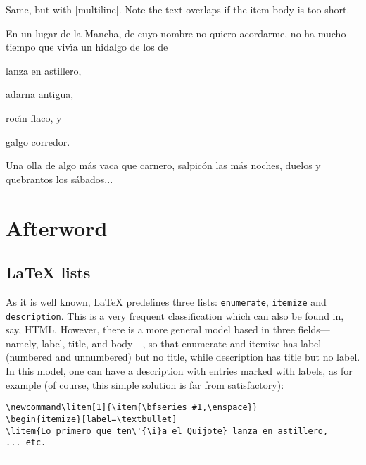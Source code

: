 \documentclass[a4paper]{ltxguide}
\begin{document}
\begin{enumerate}[leftmargin=*]
\begin{enumerate}[leftmargin=\parindent]
\begin{enumerate}[labelindent=\parindent,|\allowbreak
| leftmargin=*,|\allowbreak| label=\Roman*.,|\allowbreak
| widest=III,|\allowbreak| align=left]
\begin{enumerate}[label=\fbox{\arabic*}]
\newsample

Same, but with |multiline|. Note the text overlaps if the item body is
too short.

\samplesep

En un lugar de la Mancha, de cuyo nombre no quiero acordarme,
no ha mucho tiempo que viv\'{\i}a un hidalgo de los de
\begin{description}[font=\sffamily\bfseries, leftmargin=3cm,
    style=multiline]
\item[Lo primero que ten\'{\i}a el Quijote] lanza en astillero,
\item[Lo segundo] adarna antigua,
\item[Lo tercero] roc\'{\i}n flaco, y
\item[Y por \'{u}ltimo, lo cuarto] galgo corredor.
\end{description}
Una olla de algo m\'{a}s vaca que carnero, salpic\'{o}n las m\'{a}s
noches, duelos y quebrantos los s\'{a}bados...

\fi

\normalsize

\section{Afterword}

\subsection{\LaTeX{} lists}

As it is well known, \LaTeX{} predefines three lists:
\texttt{enumerate}, \texttt{itemize} and \texttt{description}.  This
is a very frequent classification which can also be found in, say,
HTML. However, there is a more general model based in three
fields---namely, label, title, and body---, so that enumerate and
itemize has label (numbered and unnumbered) but no title, while
description has title but no label.  In this model, one can have a
description with entries marked with labels, as for example (of 
course, this simple solution is far from satisfactory):
\begin{verbatim}
\newcommand\litem[1]{\item{\bfseries #1,\enspace}}
\begin{itemize}[label=\textbullet]
\litem{Lo primero que ten\'{\i}a el Quijote} lanza en astillero,
... etc.
\end{verbatim}

\vskip6pt
\goodbreak
\hrule
\vskip6pt


\end{enumerate}
\end{enumerate}
\end{enumerate}
\end{enumerate}
\end{document}
